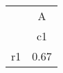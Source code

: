\begin{tabular}{l*{1}{c}}
\hline\hline
            &           A\\
            &          c1\\
\hline
r1          &        0.67\\
\hline\hline
\end{tabular}
